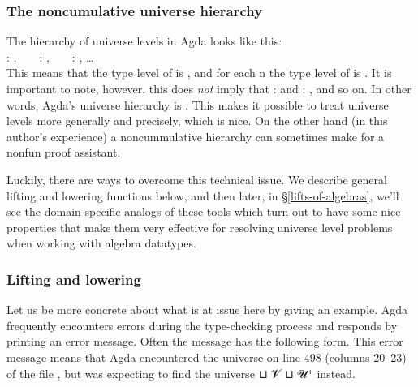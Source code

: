 \subsubsection{The noncumulative universe hierarchy}\label{the-noncumulative-hierarchy}

The hierarchy of universe levels in Agda looks like this:\\[-4pt]

 \as :  , ~ ~  \as :  , ~ ~  \as :  , \ldots{}\\[4pt]
This means that the type level of  is , and for each \ab n the type level of  is .
It is important to note, however, this does \emph{not} imply that  \as :  and  \as : , and so on. In other words, Agda's universe hierarchy is . This makes it possible to treat universe levels more generally and precisely, which is nice. On the other hand (in this author's experience) a noncummulative hierarchy can sometimes make for a nonfun proof assistant.

Luckily, there are ways to overcome this technical issue. We describe general lifting and lowering functions below, and then later, in \S\ref{lifts-of-algebras},
we'll see the domain-specific analogs of these tools which turn out to have some nice properties that make them very effective for resolving universe level problems when working with algebra datatypes.

\subsubsection{Lifting and lowering}\label{lifting-and-lowering}

Let us be more concrete about what is at issue here by giving an example. Agda frequently encounters errors during the type-checking process and responds by printing an error message. Often the message has the following form.
{\color{red}{\small
\begin{verbatim}
  Algebras.lagda:498,20-23 𝓤 != 𝓞 ⊔ 𝓥 ⊔ 𝓤 ⁺ when checking that... has type...
\end{verbatim}}}
\noindent This error message means that Agda encountered the universe  on line 498 (columns 20--23) of the file , but was expecting to find the universe  \aop ⊔ \ab 𝓥 \aop ⊔ \ab 𝓤\af ⁺ instead.

